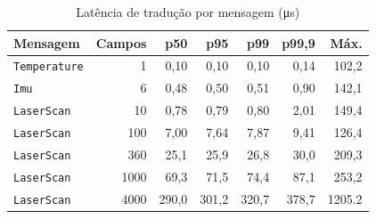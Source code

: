 \documentclass[
    12pt,
    oneside,
    a4paper,
    chapter=TITLE,
    section=TITLE,
    english,
    brazil
]{abntex2}
\begin{document}
\begin{table}[H]
\centering
\fontsize{10}{12}\selectfont
\caption{Latência de tradução por mensagem (\si{\micro\second})}
\label{tab:h1}
\begin{tabular}{@{}lrrrrrr@{}}
\toprule
\textbf{Mensagem} & \textbf{Campos} & \textbf{p50} & \textbf{p95} &
 \textbf{p99} & \textbf{p99,9} & \textbf{Máx.} \\
\midrule
\texttt{Temperature} & 1 & 0,10 & 0,10 & 0,10 & 0,14 & 102,2 \\
\texttt{Imu} & 6 & 0,48 & 0,50 & 0,51 & 0,90 & 142,1 \\
\texttt{LaserScan} & 10 & 0,78 & 0,79 & 0,80 & 2,01 & 149,4 \\
\texttt{LaserScan} & 100 & 7,00 & 7,64 & 7,87 & 9,41 & 126,4 \\
\texttt{LaserScan} & 360 & 25,1 & 25,9 & 26,8 & 30,0 & 209,3 \\
\texttt{LaserScan} & \num{1000} & 69,3 & 71,5 & 74,4 & 87,1 & 253,2 \\
\texttt{LaserScan} & \num{4000} & 290,0 & 301,2 & 320,7 & 378,7 & \num{1205.2} \\
\bottomrule
\end{tabular}
\end{table}
\end{document}
